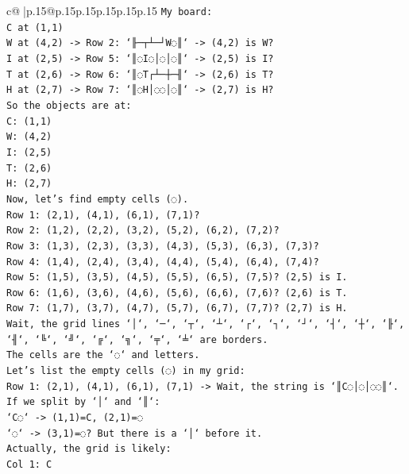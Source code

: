 \documentclass{article}
\begin{document}
{\begin{supertabular}{c@{$\;$}|p{.15\linewidth}@{}p{.15\linewidth}p{.15\linewidth}p{.15\linewidth}p{.15\linewidth}p{.15\linewidth}}
{{{\texttt{My board:} \\
\texttt{C at (1,1)} \\
\texttt{W at (4,2) {-}> Row 2: `╟─┬┴─┘W◌║` {-}> (4,2) is W?} \\
\texttt{I at (2,5) {-}> Row 5: `║◌I◌│◌│◌║` {-}> (2,5) is I?} \\
\texttt{T at (2,6) {-}> Row 6: `║◌T┌┴─┼─╢` {-}> (2,6) is T?} \\
\texttt{H at (2,7) {-}> Row 7: `║◌H│◌◌│◌║` {-}> (2,7) is H?} \\
\texttt{So the objects are at:} \\
\texttt{C: (1,1)} \\
\texttt{W: (4,2)} \\
\texttt{I: (2,5)} \\
\texttt{T: (2,6)} \\
\texttt{H: (2,7)} \\
\texttt{Now, let's find empty cells (◌).} \\
\texttt{Row 1: (2,1), (4,1), (6,1), (7,1)?} \\
\texttt{Row 2: (1,2), (2,2), (3,2), (5,2), (6,2), (7,2)?} \\
\texttt{Row 3: (1,3), (2,3), (3,3), (4,3), (5,3), (6,3), (7,3)?} \\
\texttt{Row 4: (1,4), (2,4), (3,4), (4,4), (5,4), (6,4), (7,4)?} \\
\texttt{Row 5: (1,5), (3,5), (4,5), (5,5), (6,5), (7,5)? (2,5) is I.} \\
\texttt{Row 6: (1,6), (3,6), (4,6), (5,6), (6,6), (7,6)? (2,6) is T.} \\
\texttt{Row 7: (1,7), (3,7), (4,7), (5,7), (6,7), (7,7)? (2,7) is H.} \\
\texttt{Wait, the grid lines `│`, `─`, `┬`, `┴`, `┌`, `┐`, `┘`, `┤`, `┼`, `╟`, `╢`, `╚`, `╝`, `╔`, `╗`, `╤`, `╧` are borders.} \\
\texttt{The cells are the `◌` and letters.} \\
\texttt{Let's list the empty cells (◌) in my grid:} \\
\texttt{Row 1: (2,1), (4,1), (6,1), (7,1) {-}> Wait, the string is `║C◌│◌│◌◌║`.} \\
\texttt{If we split by `│` and `║`:} \\
\texttt{`C◌` {-}> (1,1)=C, (2,1)=◌} \\
\texttt{`◌` {-}> (3,1)=◌? But there is a `│` before it.} \\
\texttt{Actually, the grid is likely:} \\
\texttt{Col 1: C} \\
}}}
\end{supertabular}}
\end{document}
